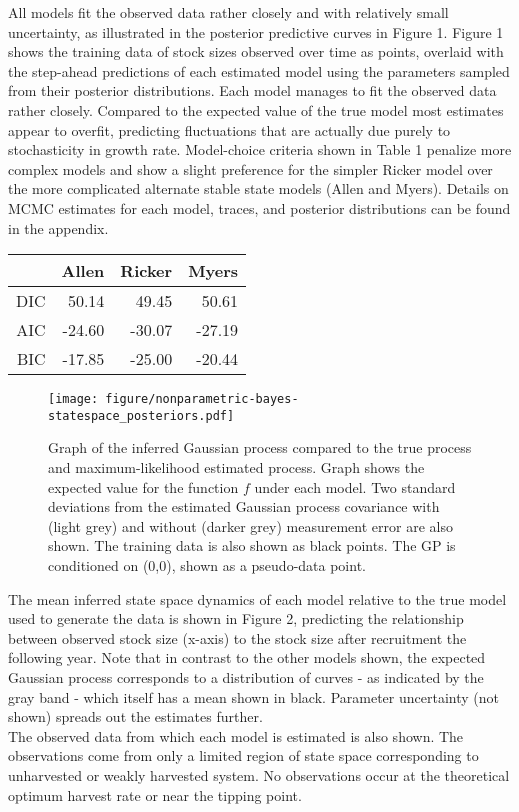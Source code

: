 \documentclass[author-year, review]{elsarticle} %
\makeatletter
\def\maxwidth{\ifdim\Gin@nat@width>\linewidth\linewidth
\else\Gin@nat@width\fi}
\let\Oldincludegraphics\includegraphics
\renewcommand{\includegraphics}[1]{\Oldincludegraphics[width=\maxwidth]{#1}}
\makeatother
\begin{document}
All models fit the observed data rather closely and with relatively
small uncertainty, as illustrated in the posterior predictive curves in
Figure 1. Figure 1 shows the training data of stock sizes observed over
time as points, overlaid with the step-ahead predictions of each
estimated model using the parameters sampled from their posterior
distributions. Each model manages to fit the observed data rather
closely. Compared to the expected value of the true model most estimates
appear to overfit, predicting fluctuations that are actually due purely
to stochasticity in growth rate. Model-choice criteria shown in Table 1
penalize more complex models and show a slight preference for the
simpler Ricker model over the more complicated alternate stable state
models (Allen and Myers). Details on MCMC estimates for each model,
traces, and posterior distributions can be found in the appendix.

\begin{table}[ht]
\begin{center}
\begin{tabular}{rrrr}
  \hline
 & Allen & Ricker & Myers \\ 
  \hline
DIC & 50.14 & 49.45 & 50.61 \\ 
  AIC & -24.60 & -30.07 & -27.19 \\ 
  BIC & -17.85 & -25.00 & -20.44 \\ 
   \hline
\end{tabular}
\end{center}
\end{table}

\begin{figure}[htbp]
\centering
\texttt{[image: figure/nonparametric-bayes-statespace\_posteriors.pdf]}
\caption{Graph of the inferred Gaussian process compared to the true
process and maximum-likelihood estimated process. Graph shows the
expected value for the function $f$ under each model. Two standard
deviations from the estimated Gaussian process covariance with (light
grey) and without (darker grey) measurement error are also shown. The
training data is also shown as black points. The GP is conditioned on
(0,0), shown as a pseudo-data point.}
\end{figure}

The mean inferred state space dynamics of each model relative to the
true model used to generate the data is shown in Figure 2, predicting
the relationship between observed stock size (x-axis) to the stock size
after recruitment the following year. Note that in contrast to the other
models shown, the expected Gaussian process corresponds to a
distribution of curves - as indicated by the gray band - which itself
has a mean shown in black. Parameter uncertainty (not shown) spreads out
the estimates further.\\The observed data from which each model is
estimated is also shown. The observations come from only a limited
region of state space corresponding to unharvested or weakly harvested
system. No observations occur at the theoretical optimum harvest rate or
near the tipping point.
\end{document}
